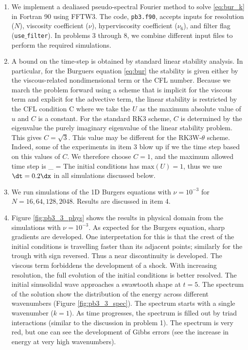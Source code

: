 \documentclass[11pt]{article}
\begin{document}
\begin{enumerate}

    \item We implement a dealiased pseudo-spectral Fourier method to solve \eqref{eq:bur_k} in Fortran 90 using
        FFTW3. The code, \texttt{pb3.f90}, accepts inputs for resolution ($N$), viscosity coefficient ($\nu$), hyperviscosity coefficient ($\nu_6$), and filter flag (\texttt{use$\_$filter}). In problems 3 through  8, we combine different input files to perform the required simulations.

    \item A bound on the time-step is obtained by standard linear stability analysis. In particular, for the Burguers equation \eqref{eq:bur} the stability is given either by the viscous-related nondimensional term or the CFL number. Because we march the problem forward using a scheme that is implicit for the viscous term and explicit for the advective term, the linear stability is restricted by the CFL condition
        \beq
            \label{eq:cfl}
              {} \le C \com
        \eeq
        where we take the $U$ as the maximum absolute value of $u$ and $C$ is a constant. For the standard RK3 scheme, $C$ is 
        determined by the eigenvalue the purely imaginary eigenvalue of the linear stability problem. This gives  $C = \sqrt{3}$. This value may be different for the RK3W-$\theta$ scheme. Indeed, some of the experiments in item 3 blow up if we the time step based on this values of $C$. We therefore choose $C=1$, and the maximum allowed time step is
        \beq
        \dt_{} = \per
        \eeq    
        The initial conditions has $\text{max}(U)=1$, thus we use $\dt = 0.2 \dx$ in all simulations discussed below.

    \item We run simulations of the 1D Burgers equations with $\nu=10^{-3}$ for $N = 16, 64, 128, 2048$. Results are discussed in item 4.

    \item Figure \ref{fig:pb3_3_phys} shows the results in physical domain from the simulations with $\nu = 10^{-3}$. As expected for the Burgers equation, sharp gradients are developed. One interpretation for this is that the crest of the initial conditions is travelling faster than its adjacent points; similarly for the trough with sign reversed. Thus a near discontinuity is developed. The viscous term forbiddens the development of a shock. With increasing resolution, the full evolution of the initial conditions is better resolved. The initial sinusolidal wave approaches a swawtooth shape at $t=5$. The spectrum of the solution show the distribution of the energy across different wavenumbers (Figure \ref{fig:pb3_3_spec}). The spectrum starts with a single wavenumber ($k=1$). As time progresses, the spectrum is filled out by triad interactions (similar to the discussion in problem 1). The spectrum is very red, but one can see the development of Gibbs errors (see the increase in energy at very high wavenumbers). 


\end{enumerate}
\end{document}
